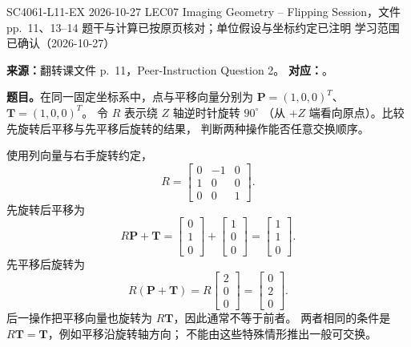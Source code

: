 

\examplemeta
  {SC4061-L11-EX}
  {2026-10-27}
  {LEC07 Imaging Geometry -- Flipping Session，文件 pp.~11、13--14}
  {题干与计算已按原页核对；单位假设与坐标约定已注明}
  {学习范围已确认（2026-10-27）}

\nopagebreak[4]

\textbf{来源：}翻转课文件 p.~11，Peer-Instruction Question 2。
\textbf{对应：}。

\textbf{题目。}在同一固定坐标系中，点与平移向量分别为
$\bm P=(1,0,0)^T$、$\bm T=(1,0,0)^T$。
令 $R$ 表示绕 $Z$ 轴逆时针旋转 $90^\circ$
（从 $+Z$ 端看向原点）。比较先旋转后平移与先平移后旋转的结果，
判断两种操作能否任意交换顺序。

\begin{checkedsolution}
使用列向量与右手旋转约定，
\[
  R=\begin{bmatrix}0&-1&0\\1&0&0\\0&0&1\end{bmatrix}.
\]
先旋转后平移为
\[
  R\bm P+\bm T
  =\begin{bmatrix}0\\1\\0\end{bmatrix}
   +\begin{bmatrix}1\\0\\0\end{bmatrix}
  =\boxed{\begin{bmatrix}1\\1\\0\end{bmatrix}}.
\]
先平移后旋转为
\[
  R(\bm P+\bm T)
  =R\begin{bmatrix}2\\0\\0\end{bmatrix}
  =\boxed{\begin{bmatrix}0\\2\\0\end{bmatrix}}.
\]
后一操作把平移向量也旋转为 $R\bm T$，因此通常不等于前者。
两者相同的条件是 $R\bm T=\bm T$，例如平移沿旋转轴方向；
不能由这些特殊情形推出一般可交换。
\end{checkedsolution}

